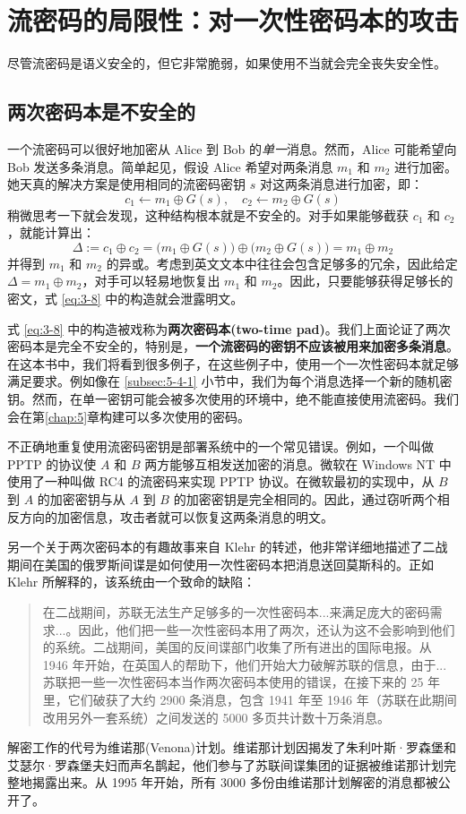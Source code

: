 \section{流密码的局限性：对一次性密码本的攻击}

尽管流密码是语义安全的，但它非常脆弱，如果使用不当就会完全丧失安全性。

\subsection{两次密码本是不安全的}

一个流密码可以很好地加密从 Alice 到 Bob 的\emph{单一}消息。然而，Alice 可能希望向 Bob 发送多条消息。简单起见，假设 Alice 希望对两条消息 $m_1$ 和 $m_2$ 进行加密。她天真的解决方案是使用相同的流密码密钥 $s$ 对这两条消息进行加密，即：
\begin{equation}\label{eq:3-8}
c_1\leftarrow m_1\oplus G(s),\quad
c_2\leftarrow m_2\oplus G(s)
\end{equation}
稍微思考一下就会发现，这种结构根本就是不安全的。对手如果能够截获 $c_1$ 和 $c_2$，就能计算出：
$$
\Delta:=c_1\oplus c_2=
\big(m_1\oplus G(s)\big)\oplus\big(m_2\oplus G(s)\big)
=m_1\oplus m_2
$$
并得到 $m_1$ 和 $m_2$ 的异或。考虑到英文文本中往往会包含足够多的冗余，因此给定 $\Delta=m_1\oplus m_2$，对手可以轻易地恢复出 $m_1$ 和 $m_2$。因此，只要能够获得足够长的密文，式 \ref{eq:3-8} 中的构造就会泄露明文。

式 \ref{eq:3-8} 中的构造被戏称为\textbf{两次密码本(two-time pad)}。我们上面论证了两次密码本是完全不安全的，特别是，\textbf{一个流密码的密钥不应该被用来加密多条消息}。在这本书中，我们将看到很多例子，在这些例子中，使用一个一次性密码本就足够满足要求。例如像在 \ref{subsec:5-4-1} 小节中，我们为每个消息选择一个新的随机密钥。然而，在单一密钥可能会被多次使用的环境中，绝不能直接使用流密码。我们会在第\ref{chap:5}章构建可以多次使用的密码。

不正确地重复使用流密码密钥是部署系统中的一个常见错误。例如，一个叫做 PPTP 的协议使 $A$ 和 $B$ 两方能够互相发送加密的消息。微软在 Windows NT 中使用了一种叫做 RC4 的流密码来实现 PPTP 协议。在微软最初的实现中，从 $B$ 到 $A$ 的加密密钥与从 $A$ 到 $B$ 的加密密钥是完全相同的。因此，通过窃听两个相反方向的加密信息，攻击者就可以恢复这两条消息的明文。

另一个关于两次密码本的有趣故事来自 Klehr 的转述，他非常详细地描述了二战期间在美国的俄罗斯间谍是如何使用一次性密码本把消息送回莫斯科的。正如 Klehr 所解释的，该系统由一个致命的缺陷：
\begin{quote}
在二战期间，苏联无法生产足够多的一次性密码本...来满足庞大的密码需求...。因此，他们把一些一次性密码本用了两次，还认为这不会影响到他们的系统。二战期间，美国的反间谍部门收集了所有进出的国际电报。从 1946 年开始，在英国人的帮助下，他们开始大力破解苏联的信息，由于...苏联把一些一次性密码本当作两次密码本使用的错误，在接下来的 25 年里，它们破获了大约 2900 条消息，包含 1941 年至 1946 年（苏联在此期间改用另外一套系统）之间发送的 5000 多页共计数十万条消息。
\end{quote}
解密工作的代号为维诺那(Venona)计划。维诺那计划因揭发了朱利叶斯·罗森堡和艾瑟尔·罗森堡夫妇而声名鹊起，他们参与了苏联间谍集团的证据被维诺那计划完整地揭露出来。从 1995 年开始，所有 3000 多份由维诺那计划解密的消息都被公开了。

